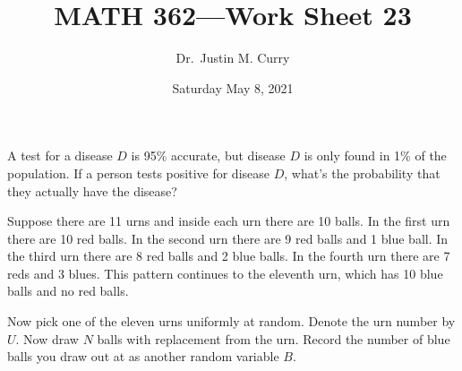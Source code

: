 \documentclass[addpoints,12pt]{exam}
\title{\vspace{-1in} MATH 362---Work Sheet 23}
\date{Saturday May 8, 2021}
\author{Dr.~Justin M. Curry}
\begin{document}
\maketitle





\begin{questions}

\question[1] A test for a disease $D$ is 95\% accurate, but disease $D$ is only found in 1\% of the population. If a person tests positive for disease $D$, what's the probability that they actually have the disease?

\vspace{1.7in}

\question[4] Suppose there are 11 urns and inside each urn there are 10 balls. In the first urn there are 10 red balls. In the second urn there are 9 red balls and 1 blue ball. In the third urn there are 8 red balls and 2 blue balls. In the fourth urn there are 7 reds and 3 blues. This pattern continues to the eleventh urn, which has 10 blue balls and no red balls.

Now pick one of the eleven urns uniformly at random. Denote the urn number by $U$. Now draw $N$ balls with replacement from the urn. Record the number of blue balls you draw out at as another random variable $B$.

\noaddpoints
{}
\end{questions}
\end{document}
